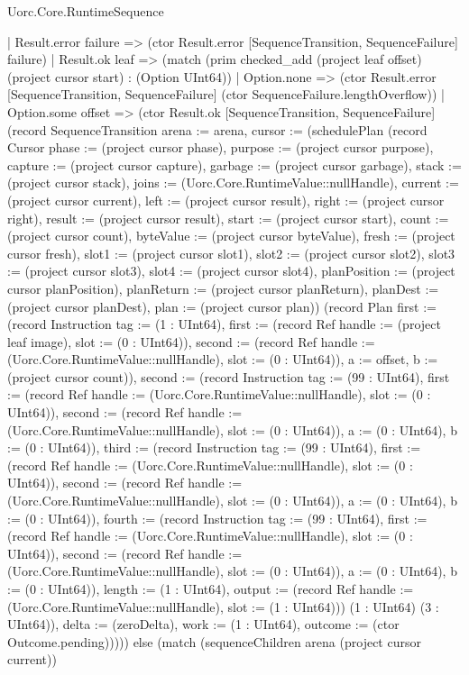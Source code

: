 \begin{lexlean}{Uorc.Core.RuntimeSequence}
\begin{semanticmodule}
{      | Result.error failure => (ctor Result.error [SequenceTransition, SequenceFailure] failure)
      | Result.ok leaf => (match (prim checked_add (project leaf offset) (project cursor start) : (Option UInt64))
        | Option.none => (ctor Result.error [SequenceTransition, SequenceFailure] (ctor SequenceFailure.lengthOverflow))
        | Option.some offset => (ctor Result.ok [SequenceTransition, SequenceFailure] (record SequenceTransition {arena := arena, cursor := (schedulePlan (record Cursor {phase := (project cursor phase), purpose := (project cursor purpose), capture := (project cursor capture), garbage := (project cursor garbage), stack := (project cursor stack), joins := (Uorc.Core.RuntimeValue::nullHandle), current := (project cursor current), left := (project cursor result), right := (project cursor right), result := (project cursor result), start := (project cursor start), count := (project cursor count), byteValue := (project cursor byteValue), fresh := (project cursor fresh), slot1 := (project cursor slot1), slot2 := (project cursor slot2), slot3 := (project cursor slot3), slot4 := (project cursor slot4), planPosition := (project cursor planPosition), planReturn := (project cursor planReturn), planDest := (project cursor planDest), plan := (project cursor plan)}) (record Plan {first := (record Instruction {tag := (1 : UInt64), first := (record Ref {handle := (project leaf image), slot := (0 : UInt64)}), second := (record Ref {handle := (Uorc.Core.RuntimeValue::nullHandle), slot := (0 : UInt64)}), a := offset, b := (project cursor count)}), second := (record Instruction {tag := (99 : UInt64), first := (record Ref {handle := (Uorc.Core.RuntimeValue::nullHandle), slot := (0 : UInt64)}), second := (record Ref {handle := (Uorc.Core.RuntimeValue::nullHandle), slot := (0 : UInt64)}), a := (0 : UInt64), b := (0 : UInt64)}), third := (record Instruction {tag := (99 : UInt64), first := (record Ref {handle := (Uorc.Core.RuntimeValue::nullHandle), slot := (0 : UInt64)}), second := (record Ref {handle := (Uorc.Core.RuntimeValue::nullHandle), slot := (0 : UInt64)}), a := (0 : UInt64), b := (0 : UInt64)}), fourth := (record Instruction {tag := (99 : UInt64), first := (record Ref {handle := (Uorc.Core.RuntimeValue::nullHandle), slot := (0 : UInt64)}), second := (record Ref {handle := (Uorc.Core.RuntimeValue::nullHandle), slot := (0 : UInt64)}), a := (0 : UInt64), b := (0 : UInt64)}), length := (1 : UInt64), output := (record Ref {handle := (Uorc.Core.RuntimeValue::nullHandle), slot := (1 : UInt64)})}) (1 : UInt64) (3 : UInt64)), delta := (zeroDelta), work := (1 : UInt64), outcome := (ctor Outcome.pending)})))) else (match (sequenceChildren arena (project cursor current))
}
\end{semanticmodule}
\end{lexlean}
